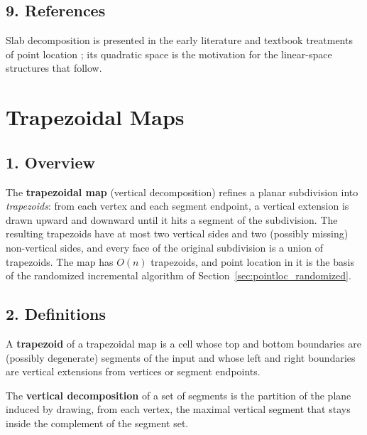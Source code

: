 \subsection{9. References}

Slab decomposition is presented in the early literature and textbook
treatments of point location \cite{preparata1985,berg2008}; its quadratic
space is the motivation for the linear-space structures that follow.

\section{Trapezoidal Maps}
\label{sec:pointloc_trapezoidal}

\subsection{1. Overview}

The \textbf{trapezoidal map} (vertical
decomposition) refines a planar subdivision into \emph{trapezoids}: from
each vertex and each segment endpoint, a vertical extension is drawn upward
and downward until it hits a segment of the subdivision. The resulting
trapezoids have at most two vertical sides and two (possibly missing)
non-vertical sides, and every face of the original subdivision is a union
of trapezoids. The map has $O(n)$ trapezoids, and point location in it is
the basis of the randomized incremental algorithm of
Section~\ref{sec:pointloc_randomized}.

\subsection{2. Definitions}

\begin{definition}[Trapezoid]\label{def:pointloc_trapezoid}
  A \textbf{trapezoid} of a trapezoidal map is a cell whose top and bottom
  boundaries are (possibly degenerate) segments of the input and whose left
  and right boundaries are vertical extensions from vertices or segment
  endpoints.
\end{definition}

\begin{definition}\label{def:pointloc_vd}
  The \textbf{vertical decomposition} of a set of segments is the
  partition of the plane induced by drawing, from each vertex, the maximal
  vertical segment that stays inside the complement of the segment set.
\end{definition}

